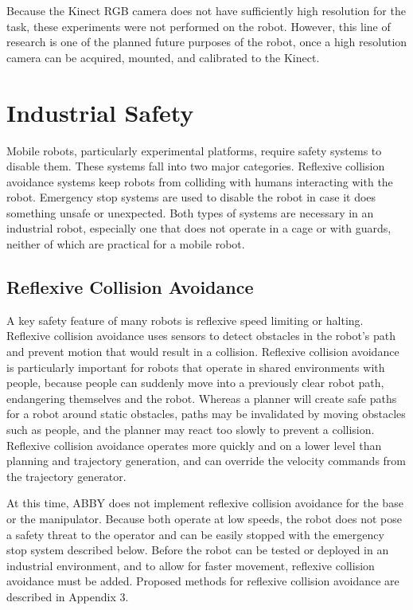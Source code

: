 \documentclass[]{cwru} %
\begin{document}
Because the Kinect RGB camera does not have sufficiently high resolution
for the task, these experiments were not performed on the robot.
However, this line of research is one of the planned future purposes of
the robot, once a high resolution camera can be acquired, mounted, and
calibrated to the Kinect.

\chapter{Industrial Safety}

Mobile robots, particularly experimental platforms, require safety
systems to disable them. These systems fall into two major categories.
Reflexive collision avoidance systems keep robots from colliding with
humans interacting with the robot. Emergency stop systems are used to
disable the robot in case it does something unsafe or unexpected. Both
types of systems are necessary in an industrial robot, especially one
that does not operate in a cage or with guards, neither of which are
practical for a mobile robot.

\section{Reflexive Collision Avoidance}
\label{reflexive-avoidance}

A key safety feature of many robots is reflexive speed limiting or
halting. Reflexive collision avoidance uses sensors to detect obstacles
in the robot's path and prevent motion that would result in a collision.
Reflexive collision avoidance is particularly important for robots that
operate in shared environments with people, because people can suddenly
move into a previously clear robot path, endangering themselves and the
robot. Whereas a planner will create safe paths for a robot around
static obstacles, paths may be invalidated by moving obstacles such as
people, and the planner may react too slowly to prevent a collision.
Reflexive collision avoidance operates more quickly and on a lower level
than planning and trajectory generation, and can override the velocity
commands from the trajectory generator.

At this time, ABBY does not implement reflexive collision avoidance for
the base or the manipulator. Because both operate at low speeds, the
robot does not pose a safety threat to the operator and can be easily
stopped with the emergency stop system described below. Before the robot
can be tested or deployed in an industrial environment, and to allow for
faster movement, reflexive collision avoidance must be added. Proposed
methods for reflexive collision avoidance are described in Appendix
3.
\end{document}
